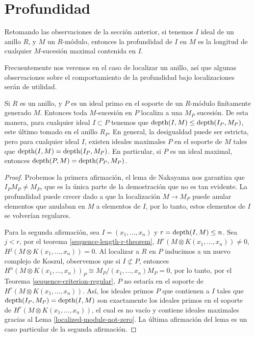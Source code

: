 \section{Profundidad}

Retomando las observaciones de la sección anterior, si tenemos $I$ ideal de un anillo $R$, y $M$ un $R$-módulo, entonces la profundidad de $I$ en $M$ es la longitud de cualquier $M$-sucesión maximal contenida en $I$.

Frecuentemente nos veremos en el caso de localizar un anillo, así que algunas observaciones sobre el comportamiento de la profundidad bajo localizaciones serán de utilidad.

\begin{lemma} \label{depth-leq-localized}
Si $R$ es un anillo, y $P$ es un ideal primo en el soporte de un $R$-módulo finítamente generado $M$. Entonces toda $M$-sucesión en $P$ localiza a una $M_P$ sucesión. De esta manera, para cualquier ideal $I \subset P$ tenemos que $\textrm{depth}(I,M) \leq \textrm{depth}(I_P, M_P)$, este último tomado en el anillo $R_P$. En general, la desigualdad puede ser estricta, pero para cualquier ideal $I$, existen ideales maximales $P$ en el soporte de $M$ tales que $\textrm{depth}(I,M) = \textrm{depth}(I_P, M_P)$. En particular, si $P$ es un ideal maximal, entonces $\textrm{depth}(P,M) = \textrm{depth}(P_P, M_P)$.
\end{lemma}

\begin{proof}
Probemos la primera afirmación, el lema de Nakayama nos garantiza que $I_PM_P \neq M_P$, que es la única parte de la demostración que no es tan evidente. La profundidad puede crecer dado a que la localización $M \rightarrow M_P$ puede anular elementos que anulaban en $M$ a elementos de $I$, por lo tanto, estos elementos de $I$ se volverían regulares.

Para la segunda afirmación, sea $I = (x_1,\dots,x_n)$ y $r = \textrm{depth}(I, M) \leq n$. Sea $j < r$, por el teorema \ref{sequence-length-r-theorem}, $H^r(M \otimes K(x_1,\dots,x_n)) \neq 0$, $H^j(M \otimes K(x_1,\dots,x_n)) = 0$. Al localizar a $R$ en $P$ inducimos a un nuevo complejo de Koszul, observemos que si $I \not\subset P$, entonces $H^n(M\otimes K(x_1,\dots,x_n))_P \cong M_P/(x_1,\dots,x_n)M_P = 0$, por lo tanto, por el Teorema \ref{sequence-criterion-regular},  $P$ no estaría en el soporte de $H^r(M \otimes K(x_1,\dots,x_n))$. Así, los ideales primos $P$ que contienen a $I$ tales que $\textrm{depth}(I_P, M_P) = \textrm{depth}(I, M)$ son exactamente los ideales primos en el soporte de $H^r(M \otimes K(x_1,\dots,x_n))$, el cual es no vacío y contiene ideales maximales gracias al Lema \ref{localized-module-not-zero}. La última afirmación del lema es un caso particular de la segunda afirmación.
\end{proof}

